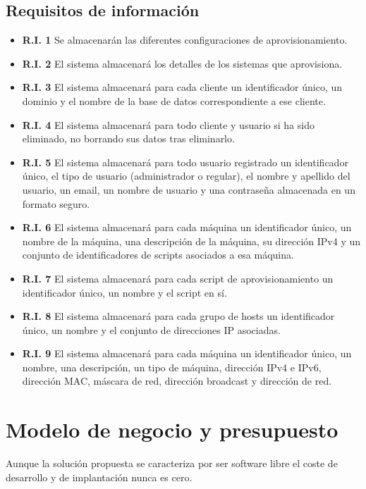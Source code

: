 \subsection{Requisitos de información}
\begin{itemize}
	\item \textbf{R.I. 1} Se almacenarán las diferentes configuraciones de aprovisionamiento.
	\item \textbf{R.I. 2} El sistema almacenará los detalles de los sistemas que aprovisiona.
	\item \textbf{R.I. 3} El sistema almacenará para cada cliente un identificador único, un dominio y el nombre de la base de datos correspondiente a ese cliente.
	\item \textbf{R.I. 4} El sistema almacenará para todo cliente y usuario si ha sido eliminado, no borrando sus datos tras eliminarlo.
	\item \textbf{R.I. 5} El sistema almacenará para todo usuario registrado un identificador único, el tipo de usuario (administrador o regular), el nombre y apellido del usuario, un email, un nombre de usuario y una contraseña almacenada en un formato seguro.
	\item \textbf{R.I. 6} El sistema almacenará para cada máquina un identificador único, un nombre de la máquina, una descripción de la máquina, su dirección IPv4 y un conjunto de identificadores de scripts asociados a esa máquina.
	\item \textbf{R.I. 7} El sistema almacenará para cada script de aprovisionamiento un identificador único, un nombre y el script en sí.
	\item \textbf{R.I. 8} El sistema almacenará para cada grupo de hosts un identificador único, un nombre y el conjunto de direcciones IP asociadas.
	\item \textbf{R.I. 9} El sistema almacenará para cada máquina un identificador único, un nombre, una descripción, un tipo de máquina, dirección IPv4 e IPv6, dirección MAC, máscara de red, dirección broadcast y dirección de red.
\end{itemize}



\section{Modelo de negocio y presupuesto}

Aunque la solución propuesta se caracteriza por ser software libre el coste de desarrollo y de implantación nunca es cero.


